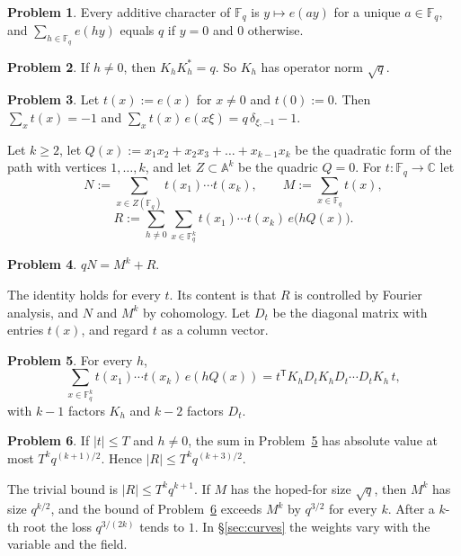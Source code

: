 \documentclass[reqno]{amsart}
\theoremstyle{definition}
\newtheorem{problem}{Problem}[section]
\theoremstyle{plain}
\newcommand{\C}{\mathbb{C}}
\newcommand{\F}{\mathbb{F}}
\newcommand{\A}{\mathbb{A}}
\newcommand{\e}{e}
\begin{document}
\begin{problem}\label{pr:orth}
Every additive character of \(\F_q\) is \(y \mapsto \e(ay)\) for a unique \(a \in \F_q\), and \(\sum_{h \in \F_q} \e(hy)\) equals \(q\) if \(y = 0\) and \(0\) otherwise.
\end{problem}

\begin{problem}\label{pr:unitary}
If \(h \ne 0\), then \(K_h K_h^* = q\).  So \(K_h\) has operator norm \(\sqrt q\).
\end{problem}

\begin{problem}\label{pr:as-hat}
Let \(t(x) := \e(x)\) for \(x \ne 0\) and \(t(0) := 0\).  Then \(\sum_x t(x) = -1\) and \(\sum_x t(x)\, \e(x\xi) = q\,\delta_{\xi,-1} - 1\).
\end{problem}

Let \(k \ge 2\), let \(Q(x) := x_1x_2 + x_2x_3 + \dots + x_{k-1}x_k\) be the quadratic form of the path with vertices \(1, \dots, k\), and let \(Z \subset \A^k\) be the quadric \(Q = 0\).  For \(t \colon \F_q \to \C\) let
\[
  N := \sum_{x \in Z(\F_q)} t(x_1) \cdots t(x_k), \qquad
  M := \sum_{x \in \F_q} t(x),
\]
\[
  R := \sum_{h \ne 0} \sum_{x \in \F_q^k} t(x_1) \cdots t(x_k)\, \e\bigl(hQ(x)\bigr).
\]

\begin{problem}\label{pr:identity}
\(qN = M^k + R\).
\end{problem}

The identity holds for every \(t\).  Its content is that \(R\) is controlled by Fourier analysis, and \(N\) and \(M^k\) by cohomology.  Let \(D_t\) be the diagonal matrix with entries \(t(x)\), and regard \(t\) as a column vector.

\begin{problem}\label{pr:matrix}
For every \(h\),
\[
  \sum_{x \in \F_q^k} t(x_1) \cdots t(x_k)\, \e(hQ(x)) = t^{\mathsf T} K_h D_t K_h D_t \cdots D_t K_h\, t,
\]
with \(k-1\) factors \(K_h\) and \(k-2\) factors \(D_t\).
\end{problem}

\begin{problem}\label{pr:parseval-k}
If \(\lvert t \rvert \le T\) and \(h \ne 0\), the sum in Problem~\ref{pr:matrix} has absolute value at most \(T^k q^{(k+1)/2}\).  Hence \(\lvert R \rvert \le T^k q^{(k+3)/2}\).
\end{problem}

The trivial bound is \(\lvert R \rvert \le T^kq^{k+1}\).  If \(M\) has the hoped-for size \(\sqrt q\), then \(M^k\) has size \(q^{k/2}\), and the bound of Problem~\ref{pr:parseval-k} exceeds \(M^k\) by \(q^{3/2}\) for every \(k\).  After a \(k\)-th root the loss \(q^{3/(2k)}\) tends to \(1\).  In \S\ref{sec:curves} the weights vary with the variable and the field.
\end{document}
